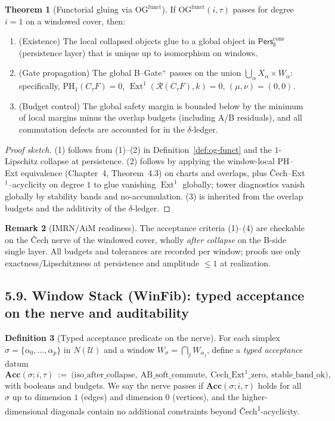 \documentclass[11pt]{article}
\numberwithin{equation}{section}
\theoremstyle{plain}
\theoremstyle{definition}
\theoremstyle{remark}
\DeclareMathOperator{\Ext}{Ext}
\theoremstyle{plain}
\theoremstyle{definition}
\numberwithin{equation}{section}
\newtheorem{theorem}{Theorem}[section]
\theoremstyle{definition}
\newtheorem{definition}[theorem]{Definition}
\newtheorem{remark}[theorem]{Remark}
\numberwithin{equation}{section}
\theoremstyle{plain}
\theoremstyle{definition}
\theoremstyle{remark}
\begin{document}
\begin{theorem}[Functorial gluing via \texorpdfstring{$\mathrm{OG}^{\mathrm{funct}}$}{OG^funct}]\label{thm:og-funct}
If $\mathrm{OG}^{\mathrm{funct}}(i,\tau)$ passes for degree $i=1$ on a windowed cover, then:
\begin{enumerate}
  \item (Existence) The local collapsed objects glue to a global object in $\mathsf{Pers}^{\mathrm{cons}}_k$ (persistence layer) that is unique up to isomorphism on windows.
  \item (Gate propagation) The global B–Gate$^{+}$ passes on the union $\bigcup_\alpha X_\alpha\times W_\alpha$: specifically, $\mathrm{PH}_1(C_\tau F)=0$, $\Ext^1(\mathcal{R}(C_\tau F),k)=0$, $(\mu,\nu)=(0,0)$.
  \item (Budget control) The global safety margin is bounded below by the minimum of local margins minus the overlap budgets (including A/B residuals), and all commutation defects are accounted for in the $\delta$-ledger.
\end{enumerate}
\end{theorem}

\begin{proof}[Proof sketch]
(1) follows from (1)–(2) in Definition~\ref{def:og-funct} and the $1$-Lipschitz collapse at persistence. (2) follows by applying the window-local PH–Ext equivalence (Chapter~4, Theorem~4.3) on charts and overlaps, plus Čech–Ext$^1$–acyclicity on degree $1$ to glue vanishing $\Ext^1$ globally; tower diagnostics vanish globally by stability bands and no-accumulation. (3) is inherited from the overlap budgets and the additivity of the $\delta$-ledger.
\end{proof}

\begin{remark}[IMRN/AiM readiness]
The acceptance criteria (1)–(4) are checkable on the Čech nerve of the windowed cover, wholly \emph{after collapse} on the B-side single layer. All budgets and tolerances are recorded per window; proofs use only exactness/Lipschitzness at persistence and amplitude $\le 1$ at realization.
\end{remark}

\subsection*{5.9. Window Stack (WinFib): typed acceptance on the nerve and auditability}

\begin{definition}[Typed acceptance predicate on the nerve]\label{def:typed-accept}
For each simplex $\sigma=\{\alpha_0,\dots,\alpha_p\}$ in $N(\mathcal{U})$ and a window $W_\sigma=\bigcap_j W_{\alpha_j}$, define a \emph{typed acceptance} datum
\[
\mathbf{Acc}(\sigma; i,\tau)\ :=\ \Big(\mathrm{iso\_after\_collapse},\ \mathrm{AB\_soft\_commute},\ \mathrm{Cech\_Ext^1\_zero},\ \mathrm{stable\_band\_ok}\Big),
\]
with booleans and budgets. We say the nerve passes if $\mathbf{Acc}(\sigma;i,\tau)$ holds for all $\sigma$ up to dimension $1$ (edges) and dimension $0$ (vertices), and the higher-dimensional diagonals contain no additional constraints beyond Čech\textsuperscript{1}-acyclicity.
\end{definition}
\end{document}
